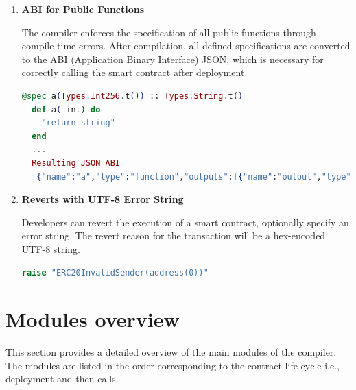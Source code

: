 \begin{enumerate}
  \begin{lstlisting}[caption={Constructor}, language=elixir, label={lst:calldata_decoding_recursive}]
    @spec constructor(Types.String.t(), Types.String.t()) :: nil
    def constructor(name, symbol) do
      Storage.store(@name, name)
      Storage.store(@symbol, symbol)
      Storage.store(@owner, Blockchain.caller())
    end
  \end{lstlisting}
  
  \item \textbf{ABI for Public Functions}
  
  The compiler enforces the specification of all public functions through compile-time errors. After compilation, all defined specifications are converted to the ABI (Application Binary Interface) JSON, which is necessary for correctly calling the smart contract after deployment.

  \begin{lstlisting}[caption={ABI \& @spec}, language=elixir, label={lst:calldata_decoding_recursive}]
  @spec a(Types.Int256.t()) :: Types.String.t()
  def a(_int) do
    "return string"
  end
  ...
  Resulting JSON ABI
  [{"name":"a","type":"function","outputs":[{"name":"output","type":"string","internal_type":"string"}],"inputs":[{"name":"_int","type":"int256","internal_type":"int256"}],"stateMutability":"view"}]
  \end{lstlisting}
  
  \item \textbf{Reverts with UTF-8 Error String}

  Developers can revert the execution of a smart contract, optionally specify an error string. The revert reason for the transaction will be a hex-encoded UTF-8 string.

  \begin{lstlisting}[caption={Reverts}, language=elixir, label={lst:calldata_decoding_recursive}]
    raise "ERC20InvalidSender(address(0))"
  \end{lstlisting}
\end{enumerate}

\section{Modules overview}
This section provides a detailed overview of the main modules of the compiler. The modules are listed in the order corresponding to the contract life cycle i.e., deployment and then calls.
